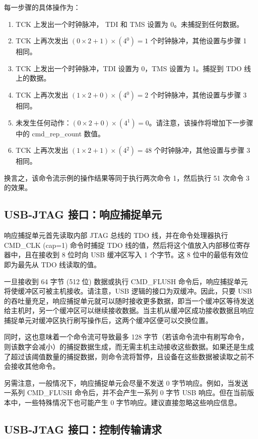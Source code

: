 \documentclass[main\_\_CN.tex]{subfiles}
\begin{document}
每一步骤的具体操作为：

\begin{enumerate}
\item TCK 上发出一个时钟脉冲， TDI 和 TMS 设置为 0。未捕捉到任何数据。
\item TCK 上再次发出 \((0\times2+1)\times(4{^0})=1\) 个时钟脉冲，其他设置与步骤 1 相同。
\item TCK 上发出一个时钟脉冲，TDI 设置为 0，TMS 设置为 1。捕捉到 TDO 线上的数据。
\item TCK 上再次发出 \((1\times2+0)\times(4{^0})=2\) 个时钟脉冲，其他设置与步骤 3 相同。
\item 未发生任何动作：\((0\times2+0)\times(4{^1})=0\)。请注意，该操作将增加下一步骤中的 cmd\_rep\_count 数值。
\item TCK 上再次发出 \((1\times2+1)\times(4{^2})=48\) 个时钟脉冲，其他设置与步骤 3 相同。
\end{enumerate}

换言之，该命令流示例的操作结果等同于执行两次命令 1，然后执行 51 次命令 3 的效果。

\subsection{USB-JTAG 接口：响应捕捉单元}

响应捕捉单元首先读取内部 JTAG 总线的 TDO 线，并在命令处理器执行 CMD\_CLK (cap=1) 命令时捕捉 TDO 线的值，然后将这个值放入内部移位寄存器中，且在接收到 8 位时向 USB 缓冲区写入 1 个字节。这 8 位中的最低有效位即为最先从 TDO 线读取的值。

一旦接收到 64 字节 (512 位) 数据或执行 CMD\_FLUSH 命令后，响应捕捉单元将使缓冲区可被主机接收。请注意，USB 逻辑的接口为双缓冲。因此，只要 USB 的吞吐量充足，响应捕捉单元就可以随时接收更多数据，即当一个缓冲区等待发送给主机时，另一个缓冲区可以继续接收数据。当主机从缓冲区成功接收数据且响应捕捉单元对缓冲区执行刷写操作后，这两个缓冲区便可以交换位置。

同时，这也意味着一个命令流可导致最多 128 字节（若该命令流中有刷写命令，则该数字会减小）的捕捉数据生成，而无需主机主动接收这些数据。如果还是生成了超过该阈值数量的捕捉数据，则命令流将暂停，且设备在这些数据被读取之前不会接收其他命令。

另需注意，一般情况下，响应捕捉单元会尽量不发送 0 字节响应。例如，当发送一系列 CMD\_FLUSH 命令后，并不会产生一系列 0 字节 USB 响应。但在当前版本中，一些特殊情况下也可能产生 0 字节响应。建议直接忽略这些响应信息。

\subsection{USB-JTAG 接口：控制传输请求}
\end{document}
